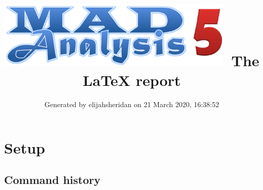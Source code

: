 \documentclass[a4paper, 10pt]{article}
\title{{\includegraphics[scale=.4]{logo.png}}\ The LaTeX report}
\author{Generated by elijahsheridan on 21 March 2020, 16:38:52}
\begin{document}
\maketitle
\flushbottom

\newpage
\section{ Setup}

\subsection{ Command history}
\end{document}
